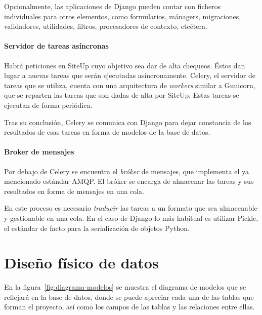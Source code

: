 Opcionalmente, las aplicaciones de Django pueden contar con ficheros
individuales para otros elementos, como formularios, mánagers, migraciones,
validadores, utilidades, filtros, procesadores de contexto, etcétera.

\paragraph{Servidor de tareas asíncronas}

Habrá peticiones en SiteUp cuyo objetivo sea dar de alta chequeos. Éstos dan
lugar a nuevas tareas que serán ejecutadas asíncronamente. Celery, el servidor
de tareas que se utiliza, cuenta con una arquitectura de \textit{workers}
similar a Gunicorn, que se reparten las tareas que son dadas de alta por
SiteUp. Estas tareas se ejecutan de forma periódica. 

Tras su conclusión, Celery se comunica con Django para dejar constancia de los
resultados de esas tareas en forma de modelos de la base de datos.

\paragraph{Broker de mensajes}

Por debajo de Celery se encuentra el \textit{bróker} de mensajes, que implementa
el ya mencionado estándar \ac{AMQP}. El bróker se encarga de almacenar las
tareas y sus resultados en forma de mensajes en una cola. 

En este proceso es necesario \textit{traducir} las tareas a un formato que sea
almacenable y gestionable en una cola. En el caso de Django lo más habitual es
utilizar Pickle, el estándar de facto para la serialización de objetos Python.

\section{Diseño físico de datos}

En la figura~\ref{fig:diagrama-modelos} se muestra el diagrama de modelos que se
reflejará en la base de datos, donde se puede apreciar cada una de las tablas
que forman el proyecto, así como los campos de las tablas y las relaciones entre
ellas.

